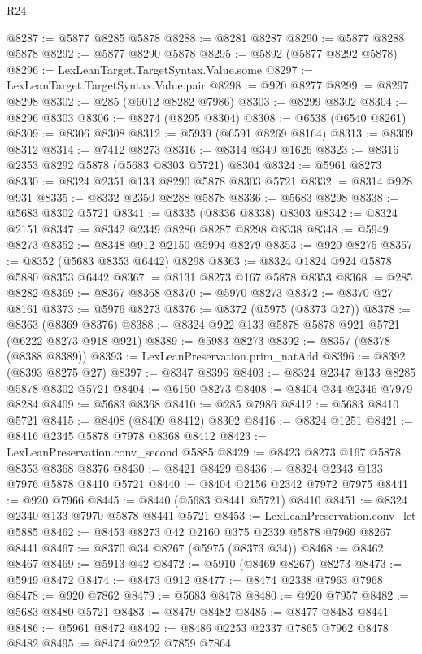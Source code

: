 \begin{lexlean}{R24}
\begin{coremodule}
@8287 := @5877 @8285 @5878
@8288 := @8281 @8287
@8290 := @5877 @8288 @5878
@8292 := @5877 @8290 @5878
@8295 := @5892 (@5877 @8292 @5878)
@8296 := LexLeanTarget.TargetSyntax.Value.some
@8297 := LexLeanTarget.TargetSyntax.Value.pair
@8298 := @920 @8277
@8299 := @8297 @8298
@8302 := @285 (@6012 @8282 @7986)
@8303 := @8299 @8302
@8304 := @8296 @8303
@8306 := @8274 (@8295 @8304)
@8308 := @6538 (@6540 @8261)
@8309 := @8306 @8308
@8312 := @5939 (@6591 @8269 @8164)
@8313 := @8309 @8312
@8314 := @7412 @8273
@8316 := @8314 @349 @1626
@8323 := @8316 @2353 @8292 @5878 (@5683 @8303 @5721) @8304
@8324 := @5961 @8273
@8330 := @8324 @2351 @133 @8290 @5878 @8303 @5721
@8332 := @8314 @928 @931
@8335 := @8332 @2350 @8288 @5878
@8336 := @5683 @8298
@8338 := @5683 @8302 @5721
@8341 := @8335 (@8336 @8338) @8303
@8342 := @8324 @2151
@8347 := @8342 @2349 @8280 @8287 @8298 @8338
@8348 := @5949 @8273
@8352 := @8348 @912 @2150 @5994 @8279
@8353 := @920 @8275
@8357 := @8352 (@5683 @8353 @6442) @8298
@8363 := @8324 @1824 @924 @5878 @5880 @8353 @6442
@8367 := @8131 @8273 @167 @5878 @8353
@8368 := @285 @8282
@8369 := @8367 @8368
@8370 := @5970 @8273
@8372 := @8370 @27 @8161
@8373 := @5976 @8273
@8376 := @8372 (@5975 (@8373 @27))
@8378 := @8363 (@8369 @8376)
@8388 := @8324 @922 @133 @5878 @5878 @921 @5721 (@6222 @8273 @918 @921)
@8389 := @5983 @8273
@8392 := @8357 (@8378 (@8388 @8389))
@8393 := LexLeanPreservation.prim_natAdd
@8396 := @8392 (@8393 @8275 @27)
@8397 := @8347 @8396
@8403 := @8324 @2347 @133 @8285 @5878 @8302 @5721
@8404 := @6150 @8273
@8408 := @8404 @34 @2346 @7979 @8284
@8409 := @5683 @8368
@8410 := @285 @7986
@8412 := @5683 @8410 @5721
@8415 := @8408 (@8409 @8412) @8302
@8416 := @8324 @1251
@8421 := @8416 @2345 @5878 @7978 @8368 @8412
@8423 := LexLeanPreservation.conv_second @5885
@8429 := @8423 @8273 @167 @5878 @8353 @8368 @8376
@8430 := @8421 @8429
@8436 := @8324 @2343 @133 @7976 @5878 @8410 @5721
@8440 := @8404 @2156 @2342 @7972 @7975
@8441 := @920 @7966
@8445 := @8440 (@5683 @8441 @5721) @8410
@8451 := @8324 @2340 @133 @7970 @5878 @8441 @5721
@8453 := LexLeanPreservation.conv_let @5885
@8462 := @8453 @8273 @42 @2160 @375 @2339 @5878 @7969 @8267 @8441
@8467 := @8370 @34 @8267 (@5975 (@8373 @34))
@8468 := @8462 @8467
@8469 := @5913 @42
@8472 := @5910 (@8469 @8267) @8273
@8473 := @5949 @8472
@8474 := @8473 @912
@8477 := @8474 @2338 @7963 @7968
@8478 := @920 @7862
@8479 := @5683 @8478
@8480 := @920 @7957
@8482 := @5683 @8480 @5721
@8483 := @8479 @8482
@8485 := @8477 @8483 @8441
@8486 := @5961 @8472
@8492 := @8486 @2253 @2337 @7865 @7962 @8478 @8482
@8495 := @8474 @2252 @7859 @7864

\end{coremodule}
\end{lexlean}
